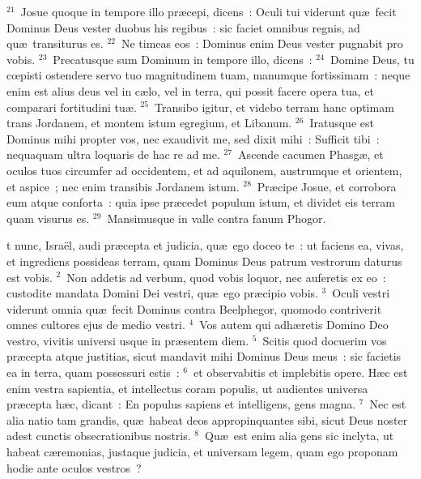 ${}^{21}$~Josue quoque in tempore illo pr\ae cepi, dicens~: Oculi tui viderunt qu\ae\ fecit Dominus Deus vester duobus his regibus~: sic faciet omnibus regnis, ad qu\ae\ transiturus es.
${}^{22}$~Ne timeas eos~: Dominus enim Deus vester pugnabit pro vobis.
${}^{23}$~Precatusque sum Dominum in tempore illo, dicens~:
${}^{24}$~Domine Deus, tu cœpisti ostendere servo tuo magnitudinem tuam, manumque fortissimam~: neque enim est alius deus vel in c\ae lo, vel in terra, qui possit facere opera tua, et comparari fortitudini tu\ae .
${}^{25}$~Transibo igitur, et videbo terram hanc optimam trans Jordanem, et montem istum egregium, et Libanum.
${}^{26}$~Iratusque est Dominus mihi propter vos, nec exaudivit me, sed dixit mihi~: Sufficit tibi~: nequaquam ultra loquaris de hac re ad me.
${}^{27}$~Ascende cacumen Phasg\ae , et oculos tuos circumfer ad occidentem, et ad aquilonem, austrumque et orientem, et aspice~; nec enim transibis Jordanem istum.
${}^{28}$~Pr\ae cipe Josue, et corrobora eum atque conforta~: quia ipse pr\ae cedet populum istum, et dividet eis terram quam visurus es.
${}^{29}$~Mansimusque in valle contra fanum Phogor.

\bchapter
{}t nunc, Isra\"el, audi pr\ae cepta et judicia, qu\ae\ ego doceo te~: ut faciens ea, vivas, et ingrediens possideas terram, quam Dominus Deus patrum vestrorum daturus est vobis.
${}^{2}$~Non addetis ad verbum, quod vobis loquor, nec auferetis ex eo~: custodite mandata Domini Dei vestri, qu\ae\ ego pr\ae cipio vobis.
${}^{3}$~Oculi vestri viderunt omnia qu\ae\ fecit Dominus contra Beelphegor, quomodo contriverit omnes cultores ejus de medio vestri.
${}^{4}$~Vos autem qui adh\ae retis Domino Deo vestro, vivitis universi usque in pr\ae sentem diem.
${}^{5}$~Scitis quod docuerim vos pr\ae cepta atque justitias, sicut mandavit mihi Dominus Deus meus~: sic facietis ea in terra, quam possessuri estis~:
${}^{6}$~et observabitis et implebitis opere. H\ae c est enim vestra sapientia, et intellectus coram populis, ut audientes universa pr\ae cepta h\ae c, dicant~: En populus sapiens et intelligens, gens magna.
${}^{7}$~Nec est alia natio tam grandis, qu\ae\ habeat deos appropinquantes sibi, sicut Deus noster adest cunctis obsecrationibus nostris.
${}^{8}$~Qu\ae\ est enim alia gens sic inclyta, ut habeat c\ae remonias, justaque judicia, et universam legem, quam ego proponam hodie ante oculos vestros~?



